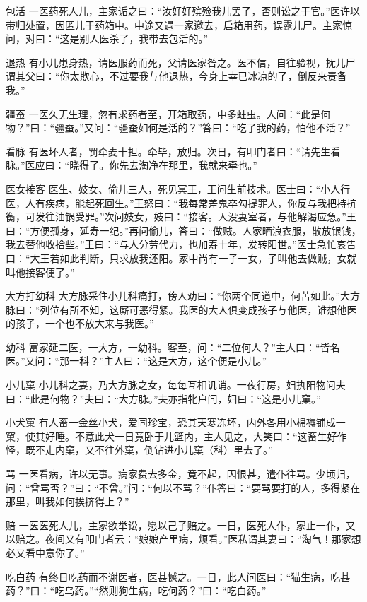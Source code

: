 \documentclass[12pt,UTF8]{ctexbook}
\begin{document}
包活
一医药死人儿，主家诟之曰：“汝好好殡殓我儿罢了，否则讼之于官。”医许以带归处置，因匿儿于药箱中。中途又遇一家邀去，启箱用药，误露儿尸。主家惊问，对曰：“这是别人医杀了，我带去包活的。”

退热
有小儿患身热，请医服药而死，父请医家咎之。医不信，自往验视，抚儿尸谓其父曰：“你太欺心，不过要我与他退热，今身上幸已冰凉的了，倒反来责备我。”

疆蚕
一医久无生理，忽有求药者至，开箱取药，中多蛀虫。人问：“此是何物？”曰：“疆蚕。”又问：“疆蚕如何是活的？”答曰：“吃了我的药，怕他不活？”

看脉
有医坏人者，罚牵麦十担。牵毕，放归。次日，有叩门者曰：“请先生看脉。”医应曰：“晓得了。你先去淘净在那里，我就来牵也。”

医女接客
医生、妓女、偷儿三人，死见冥王，王问生前技术。医士曰：“小人行医，人有疾病，能起死回生。”王怒曰：“我每常差鬼卒勾提罪人，你反与我把持抗衡，可发往油锅受罪。”次问妓女，妓曰：“接客。人没妻室者，与他解渴应急。”王曰：“方便孤身，延寿一纪。”再问偷儿，答曰：“做贼。人家晒浪衣服，散放银钱，我去替他收拾些。”王曰：“与人分劳代力，也加寿十年，发转阳世。”医士急忙哀告曰：“大王若如此判断，只求放我还阳。家中尚有一子一女，子叫他去做贼，女就叫他接客便了。”

大方打幼科
大方脉采住小儿科痛打，傍人劝曰：“你两个同道中，何苦如此。”大方脉曰：“列位有所不知，这厮可恶得紧。我医的大人俱变成孩子与他医，谁想他医的孩子，一个也不放大来与我医。”

幼科
富家延二医，一大方，一幼科。客至，问：“二位何人？”主人曰：“皆名医。”又问：“那一科？”主人曰：“这是大方，这个便是小儿。”

小儿窠
小儿科之妻，乃大方脉之女，每每互相讥诮。一夜行房，妇执阳物问夫曰：“此是何物？”夫曰：“大方脉。”夫亦指牝户问，妇曰：“这是小儿窠。”

小犬窠
有人畜一金丝小犬，爱同珍宝，恐其天寒冻坏，内外各用小棉褥铺成一窠，使其好睡。不意此犬一日竟卧于儿篮内，主人见之，大笑曰：“这畜生好作怪，既不走内窠，又不往外窠，倒钻进小儿窠（科）里去了。”

骂
一医看病，许以无事。病家费去多金，竟不起，因恨甚，遣仆往骂。少顷归，问：“曾骂否？”曰：“不曾。”问：“何以不骂？”仆答曰：“要骂要打的人，多得紧在那里，叫我如何挨挤得上？”

赔
一医医死人儿，主家欲举讼，愿以己子赔之。一日，医死人仆，家止一仆，又以赔之。夜间又有叩门者云：“娘娘产里病，烦看。”医私谓其妻曰：“淘气！那家想必又看中意你了。”

吃白药
有终日吃药而不谢医者，医甚憾之。一日，此人问医曰：“猫生病，吃甚药？”曰：“吃乌药。”“然则狗生病，吃何药？”曰：“吃白药。”
\end{document}
